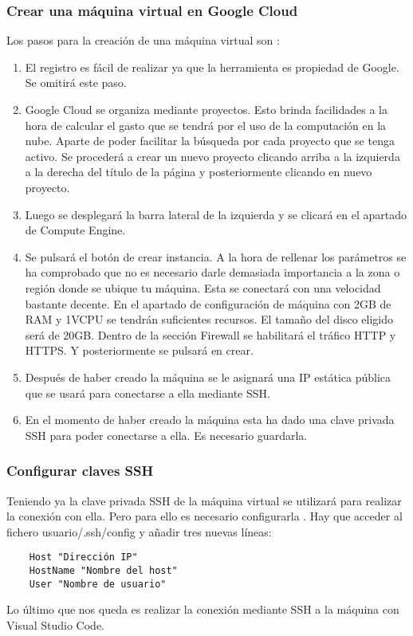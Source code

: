 \subsubsection{Crear una máquina virtual en Google Cloud}
Los pasos para la creación de una máquina virtual son \cite{google-cloud-documentation}:

\begin{enumerate}
    \item El registro es fácil de realizar ya que la herramienta es propiedad de Google. Se omitirá este paso.
    \item Google Cloud se organiza mediante proyectos. Esto brinda facilidades a la hora de calcular el gasto que se tendrá por el uso de la computación en la nube. Aparte de poder facilitar la búsqueda por cada proyecto que se tenga activo. Se procederá a crear un nuevo proyecto clicando arriba a la izquierda a la derecha del título de la página y posteriormente clicando en nuevo proyecto.
    \item Luego se desplegará la barra lateral de la izquierda y se clicará en el apartado de Compute Engine.
    \item Se pulsará el botón de crear instancia. A la hora de rellenar los parámetros se ha comprobado que no es necesario darle demasiada importancia a la zona o región donde se ubique tu máquina. Esta se conectará con una velocidad bastante decente. En el apartado de configuración de máquina con 2GB de RAM y 1VCPU se tendrán suficientes recursos. El tamaño del disco eligido será de 20GB. Dentro de la sección Firewall se habilitará el tráfico HTTP y HTTPS. Y posteriormente se pulsará en crear.
    \item Después de haber creado la máquina se le asignará una IP estática pública que se usará para conectarse a ella mediante SSH.
    \item En el momento de haber creado la máquina esta ha dado una clave privada SSH para poder conectarse a ella. Es necesario guardarla.
\end{enumerate}

\subsubsection{Configurar claves SSH}

Teniendo ya la clave privada SSH de la máquina virtual se utilizará para realizar la conexión con ella. Pero para ello es necesario configurarla \cite{ssh-connection}. Hay que acceder al fichero usuario/.ssh/config y añadir tres nuevas líneas:
\begin{verbatim}
    Host "Dirección IP"
    HostName "Nombre del host"
    User "Nombre de usuario"
\end{verbatim}
Lo último que nos queda es realizar la conexión mediante SSH a la máquina con Visual Studio Code.

